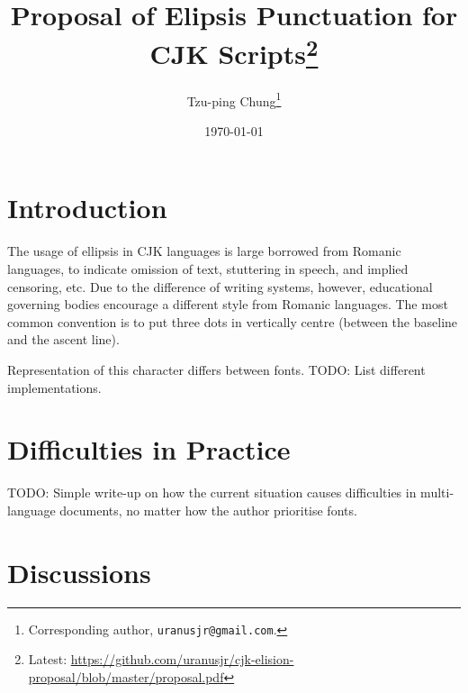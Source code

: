 \documentclass[a4paper, 12pt]{article}
\begin{document}
\title{Proposal of Elipsis Punctuation for CJK Scripts\footnote{Latest: \scriptsize \url{https://github.com/uranusjr/cjk-elision-proposal/blob/master/proposal.pdf}}}
\date{\today}

\author{Tzu-ping Chung\footnote{Corresponding author, \texttt{uranusjr@gmail.com}.}}

\maketitle



\section{Introduction}

The usage of ellipsis in CJK languages is large borrowed from Romanic languages, to indicate omission of text, stuttering in speech, and implied censoring, etc. Due to the difference of writing systems, however, educational governing bodies encourage a different style from Romanic languages. The most common convention is to put three dots in vertically centre (between the baseline and the ascent line). \cite{roc-punc}\cite{prc-punc}

Representation of this character differs between fonts. TODO: List different implementations.


\section{Difficulties in Practice}

TODO: Simple write-up on how the current situation causes difficulties in multi-language documents, no matter how the author prioritise fonts.


\section{Discussions}
\end{document}
